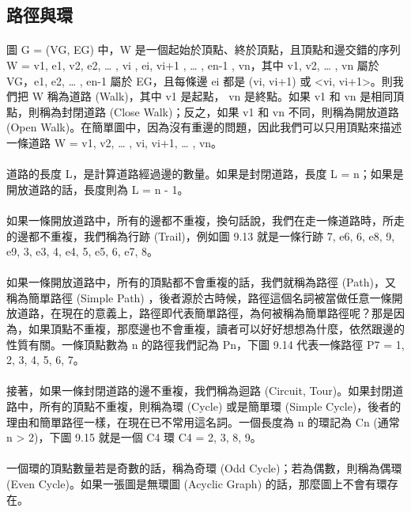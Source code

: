 \documentclass[12pt,a4paper,oneside]{report}
\begin{document}
\begin{CJK}{UTF8}{bkai}
\subsection{路徑與環}
\paragraph{}圖 G = (VG, EG) 中，W 是一個起始於頂點、終於頂點，且頂點和邊交錯的序列 W = {v1, e1, v2, e2, … , vi , ei, vi+1 , … , en-1 , vn}，其中 v1, v2, … , vn 屬於 VG，e1, e2, … , en-1 屬於 EG，且每條邊 ei 都是 (vi, vi+1) 或 <vi, vi+1>。則我們把 W 稱為道路 (Walk)，其中 v1 是起點， vn 是終點。如果 v1 和 vn 是相同頂點，則稱為封閉道路 (Close Walk)；反之，如果 v1 和 vn 不同，則稱為開放道路 (Open Walk)。在簡單圖中，因為沒有重邊的問題，因此我們可以只用頂點來描述一條道路 W = {v1, v2, … , vi, vi+1, … , vn}。
\paragraph{}道路的長度 L，是計算道路經過邊的數量。如果是封閉道路，長度 L = n；如果是開放道路的話，長度則為 L = n - 1。
\paragraph{}如果一條開放道路中，所有的邊都不重複，換句話說，我們在走一條道路時，所走的邊都不重複，我們稱為行跡 (Trail)，例如圖 9.13 就是一條行跡 {7, e6, 6, e8, 9, e9, 3, e3, 4, e4, 5, e5, 6, e7, 8}。
\paragraph{}如果一條開放道路中，所有的頂點都不會重複的話，我們就稱為路徑 (Path)，又稱為簡單路徑 (Simple Path) ，後者源於古時候，路徑這個名詞被當做任意一條開放道路，在現在的意義上，路徑即代表簡單路徑，為何被稱為簡單路徑呢？那是因為，如果頂點不重複，那麼邊也不會重複，讀者可以好好想想為什麼，依然跟邊的性質有關。一條頂點數為 n 的路徑我們記為 Pn，下圖 9.14 代表一條路徑 P7 = {1, 2, 3, 4, 5, 6, 7}。
\paragraph{}接著，如果一條封閉道路的邊不重複，我們稱為迴路 (Circuit, Tour)。如果封閉道路中，所有的頂點不重複，則稱為環 (Cycle) 或是簡單環 (Simple Cycle)，後者的理由和簡單路徑一樣，在現在已不常用這名詞。一個長度為 n 的環記為 Cn (通常 n > 2)，下圖 9.15 就是一個 C4 環 C4 = {2, 3, 8, 9}。
\paragraph{}一個環的頂點數量若是奇數的話，稱為奇環 (Odd Cycle)；若為偶數，則稱為偶環 (Even Cycle)。如果一張圖是無環圖 (Acyclic Graph) 的話，那麼圖上不會有環存在。


\end{CJK}
\end{document}
